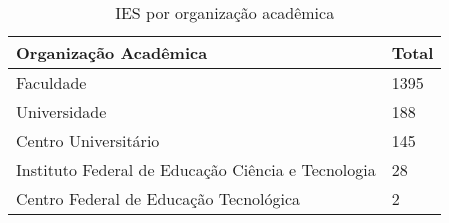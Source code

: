 \begin{table}[]
\centering
\begin{tabular}{@{}ll@{}}
\toprule
Organização Acadêmica                              & Total \\ \midrule
Faculdade                                          & 1395  \\
Universidade                                       & 188   \\
Centro Universitário                               & 145   \\
Instituto Federal de Educação Ciência e Tecnologia & 28    \\
Centro Federal de Educação Tecnológica             & 2     \\ \bottomrule
\end{tabular}
\caption{IES por organização acadêmica}
\label{tbl: ies-org-acad}
\end{table}